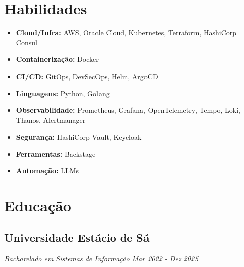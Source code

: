 \documentclass[a4paper,10pt]{article}
\begin{document}

\section{ Habilidades }
\begin{itemize}
\item \textbf{ Cloud/Infra: } AWS, Oracle Cloud, Kubernetes, Terraform, HashiCorp Consul
\item \textbf{ Containerização: } Docker
\item \textbf{ CI/CD: } GitOps, DevSecOps, Helm, ArgoCD
\item \textbf{ Linguagens: } Python, Golang
\item \textbf{ Observabilidade: } Prometheus, Grafana, OpenTelemetry, Tempo, Loki, Thanos, Alertmanager
\item \textbf{ Segurança: } HashiCorp Vault, Keycloak
\item \textbf{ Ferramentas: } Backstage
\item \textbf{ Automação: } LLMs
\end{itemize}


\section{ Educação }
\subsection*{\texorpdfstring{
\textbf{ Universidade Estácio de Sá } \hfill 
}{
Universidade Estácio de Sá -- 
}}
\textit{ Bacharelado em Sistemas de Informação \hfill Mar 2022 - Dez 2025 }
\end{document}
